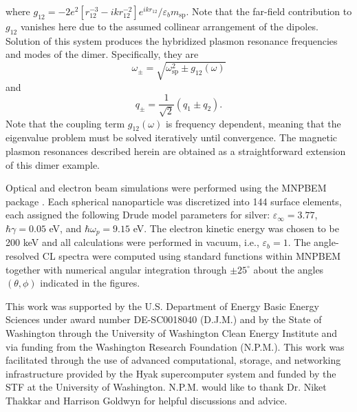 \documentclass[journal=apchd5,manuscript=article]{achemso}
\begin{document}
where $g_{12}=-2e^2[r_{12}^{-3} - ikr_{12}^{-2}]e^{ikr_{12}}/\varepsilon_bm_{\textrm{sp}}.$ Note that the far-field contribution to $g_{12}$ vanishes here due to the assumed collinear arrangement of the dipoles. Solution of this system produces the hybridized plasmon resonance frequencies and modes of the dimer. Specifically, they are
\begin{equation}
\omega_{\pm} = \sqrt{\omega_{\textrm{sp}}^2 \pm g_{12}(\omega)}
\label{eigenvalues}
\end{equation}
and
\begin{equation}
q_{\pm} = \frac{1}{\sqrt{2}}\left(q_1 \pm q_2\right).
\label{eigenvectors}
\end{equation}
Note that the coupling term $g_{12}(\omega)$ is frequency dependent, meaning that the eigenvalue problem must be solved iteratively until convergence. The magnetic plasmon resonances described herein are obtained as a straightforward extension of this dimer example.




 Optical and electron beam simulations were performed using the MNPBEM package \cite{Hohenester2012,Hohenester2014}. Each spherical nanoparticle was discretized into 144 surface elements, each assigned the following Drude model parameters for silver: $\varepsilon_{\infty} = 3.77$, $\hbar\gamma = 0.05$ eV, and $\hbar\omega_{p} = 9.15$ eV. The electron kinetic energy was chosen to be 200 keV and all calculations were performed in vacuum, i.e., $\varepsilon_{b}=1.$ The angle-resolved CL spectra were computed using standard functions within MNPBEM together with numerical angular integration through $\pm25^\circ$ about the angles $(\theta,\phi)$ indicated in the figures.


\begin{acknowledgement}
This work was supported by the U.S. Department of Energy Basic Energy Sciences under award number DE-SC0018040 (D.J.M.) and by the State of Washington through the University of Washington Clean Energy Institute and via funding from the Washington Research Foundation (N.P.M.). This work was facilitated through the use of advanced computational, storage, and networking infrastructure provided by the Hyak supercomputer system and funded by the STF at the University of Washington. N.P.M. would like to thank Dr. Niket Thakkar and Harrison Goldwyn for helpful discussions and advice.
\end{acknowledgement}


\end{document}

